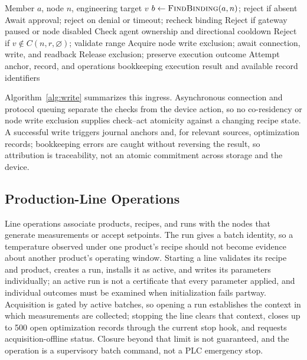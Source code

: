 \begin{algorithm}[!t]
\caption{Ordinary bound-agent setpoint request}
\label{alg:write}
\begin{algorithmic}[1]
\Require Member $a$, node $n$, engineering target $v$
\State $b\gets\textsc{FindBinding}(a,n)$; reject if absent
  \State Await approval; reject on denial or timeout; recheck binding
\EndIf
\State Reject if gateway paused or node disabled
\State Check agent ownership and directional cooldown
\State Reject if $v\notin C(n,r,\varnothing)$; validate range
\State Acquire node write exclusion; await connection, write, and readback
\State Release exclusion; preserve execution outcome
  \State Attempt anchor, record, and operations bookkeeping
\EndIf
\State \Return execution result and available record identifiers
\end{algorithmic}
\end{algorithm}

Algorithm~\ref{alg:write} summarizes this ingress. Asynchronous connection and
protocol queuing separate the checks from the device action, so no co-residency or
node write exclusion supplies check--act atomicity against a changing recipe state.
A successful write triggers journal anchors and, for relevant sources,
optimization records; bookkeeping errors are caught without reversing the result,
so attribution is traceability, not an atomic commitment across storage and the
device.

\subsection{Production-Line Operations}
\label{sec:lineops}
Line operations associate products, recipes, and runs with the nodes that generate
measurements or accept setpoints. The run gives a batch identity, so a temperature
observed under one product's recipe should not become evidence about another
product's operating window. Starting a line validates its recipe and product,
creates a run, installs it as active, and writes its parameters individually; an
active run is not a certificate that every parameter applied, and individual
outcomes must be examined when initialization fails partway. Acquisition is gated
by active batches, so opening a run establishes the context in which measurements
are collected; stopping the line clears that context, closes up to 500 open
optimization records through the current stop hook, and requests
acquisition-offline status. Closure beyond that limit is not guaranteed, and the
operation is a supervisory batch command, not a PLC emergency stop.

